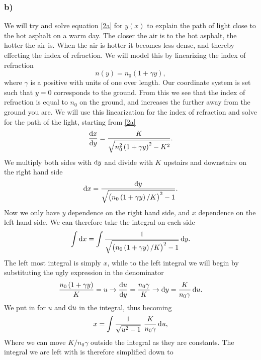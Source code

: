 \documentclass[12pt,twoside]{article}
\begin{document}
\subsubsection*{b)}
We will try and solve equation \eqref{2a} for $y(x)$ to explain the path of light close to the hot asphalt on a warm day. The closer the air is to the hot asphalt, the hotter the air is. When the air is hotter it becomes less dense, and thereby effecting the index of refraction. We will model this by linearizing the index of refraction
\begin{equation}
  n\left(y\right) = n_0\left(1+\gamma y\right),
\end{equation}
where $\gamma$ is a positive with units of one over length. Our coordinate system is set such that $y=0$ corresponds to the ground. From this we see that the index of refraction is equal to $n_0$ on the ground, and increases the further away from the ground you are. We will use this linearization for the index of refraction and solve for the path of the light, starting from \eqref{2a}
\begin{equation}
   \frac{\dif x}{\dif y} = \frac{K}{\sqrt{n_0^2\left(1+\gamma y\right)^2-K^2}}.
\end{equation}
We multiply both sides with $\dif y$ and divide with $K$ upstairs and downstairs on the right hand side
\begin{equation}
   \dif x = \frac{\dif y}{\sqrt{\left(n_0\left(1+\gamma y\right)/K\right)^2-1}}.
\end{equation}
Now we only have $y$ dependence on the right hand side, and $x$ dependence on the left hand side. We can therefore take the integral on each side
\begin{equation}
   \int \dif x = \int \frac{1}{\sqrt{\left(n_0\left(1+\gamma y\right)/K\right)^2-1}} \dif y.
\end{equation}
The left most integral is simply $x$, while to the left integral we will begin by substituting the ugly expression in the denominator
\begin{equation}
  \frac{n_0\left(1+\gamma y\right)}{K} = u \rightarrow \frac{\dif u}{\dif y} = \frac{n_0\gamma}{K} \rightarrow \dif y = \frac{K}{n_0\gamma} \dif u. \label{u}
\end{equation}
We put in for $u$ and $\dif u$ in the integral, thus becoming
\begin{equation}
   x = \int \frac{1}{\sqrt{u^2-1}} \,\,\frac{K}{n_0\gamma} \dif u,
\end{equation}
Where we can move $K/n_0\gamma$ outside the integral as they are constants. The integral we are left with is therefore simplified down to
\end{document}
